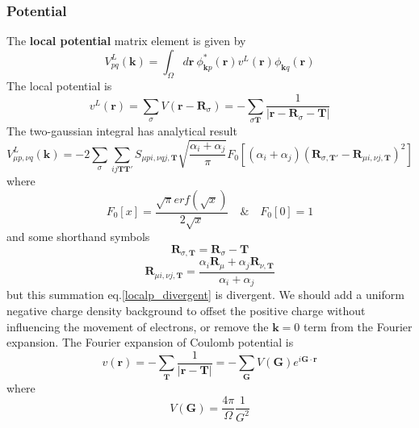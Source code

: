 \documentclass{article}
\begin{document}
        \subsubsection{Potential}
            The \textbf{local potential} matrix element\cite{McClain2017} is given by
            \begin{equation}
                V_{pq}^L(\textbf{k}) = \int_{\Omega}d\textbf{r}\ \phi_{\textbf{k}p}^*(\textbf{r})v^L(\textbf{r})\phi_{\textbf{k}q}(\textbf{r})
            \end{equation}
            The local potential is
            $$ v^L(\textbf{r}) = \sum_{\sigma}V(\textbf{r}-\textbf{R}_{\sigma}) = -\sum_{\sigma\textbf{T}}\frac{1}{|\textbf{r}-\textbf{R}_{\sigma}-\textbf{T}|} $$
            The two-gaussian integral has analytical result
            \begin{equation}
                V_{\mu p,\nu q}^L(\textbf{k}) = -2\sum_{\sigma}\sum_{ij\textbf{T}\textbf{T}'}S_{\mu pi,\nu qj,\textbf{T}}\sqrt{\frac{\alpha_i+\alpha_j}{\pi}}
                F_0\left[(\alpha_i+\alpha_j)(\textbf{R}_{\sigma,\textbf{T}'}-\textbf{R}_{\mu i,\nu j,\textbf{T}})^2\right]\label{localp_divergent}
            \end{equation}
            where
            \begin{equation}
                F_0\left[x\right] = \frac{\sqrt{\pi}erf(\sqrt{x})}{2\sqrt{x}} \quad \& \quad F_0\left[0\right] = 1\label{F0}
            \end{equation}
            and some shorthand symbols
            $$ \textbf{R}_{\sigma,\textbf{T}} = \textbf{R}_{\sigma}-\textbf{T} $$
            $$ \textbf{R}_{\mu i,\nu j,\textbf{T}} = \frac{\alpha_i\textbf{R}_{\mu}+\alpha_j\textbf{R}_{\nu,\textbf{T}}}{\alpha_i+\alpha_j} $$
            but this summation eq.\eqref{localp_divergent} is divergent.
            We should add a uniform negative charge density background to offset the positive charge without influencing the movement of electrons,
            or remove the $\textbf{k}=0$ term from the Fourier expansion.
            The Fourier expansion of Coulomb potential is
            \begin{equation}
                v(\textbf{r}) = -\sum_{\textbf{T}}\frac{1}{|\textbf{r}-\textbf{T}|}= -\sum_{\textbf{G}}V(\textbf{G})e^{i\textbf{G}\cdot\textbf{r}}
            \end{equation}
            where
            \begin{equation}
                V(\textbf{G}) = \frac{4\pi}{\Omega}\frac{1}{G^2}
            \end{equation}
\end{document}
